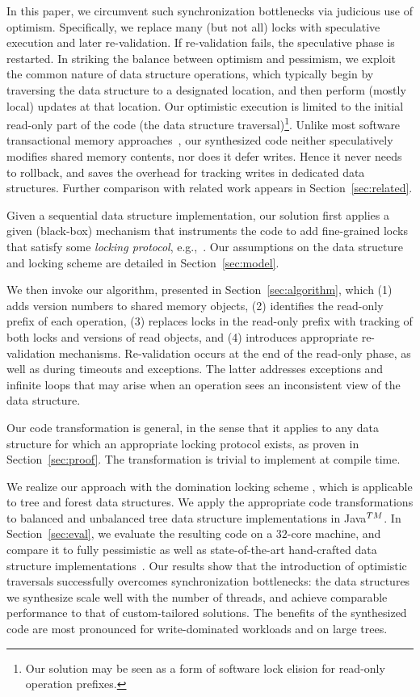 In this paper, we circumvent such synchronization bottlenecks via judicious use of optimism.
Specifically, we replace many (but not all) locks with speculative execution and later re-validation.
If re-validation fails, the speculative phase is restarted.
In striking the balance between optimism and pessimism, we exploit the common nature of data structure operations,
which typically begin by traversing the data structure to a designated location, and then perform (mostly local) updates at that location.
Our optimistic execution is limited to the initial read-only part of the code (the data structure traversal)\footnote{Our solution may be seen as a form of software lock elision for read-only operation prefixes.}.
Unlike most software transactional memory approaches~\cite{HLR:SLCA2010},
our synthesized code neither speculatively modifies shared memory contents, nor does it defer writes.
Hence it never needs to rollback, and saves the overhead for tracking writes in dedicated data structures.
Further comparison with related work appears in Section~\ref{sec:related}.

Given a sequential data structure implementation,
our solution first applies a given (black-box) mechanism that instruments the code to add
fine-grained locks that satisfy some \emph{locking protocol}, e.g.,~\cite{Gueta2011,MZGB:POPL06}.
Our assumptions on the data structure and locking scheme are detailed in Section~\ref{sec:model}.

We then invoke our algorithm, presented in Section~\ref{sec:algorithm}, which
(1) adds version numbers to shared memory objects,
(2) identifies the read-only prefix of each operation,
(3) replaces locks in the read-only prefix with tracking of both locks and versions of read objects, and
(4) introduces appropriate re-validation mechanisms.
Re-validation occurs at the end of the read-only phase, as well as during timeouts and exceptions.
The latter addresses exceptions and infinite loops that may arise when an operation sees an inconsistent view of the data structure.

Our code transformation is general, in the sense that it applies to any data structure for which an appropriate locking protocol exists,
as proven in Section~\ref{sec:proof}. The transformation is trivial to implement at compile time.

We realize our approach with the domination locking scheme \cite{Gueta2011},
which is applicable to tree and forest data structures.
We apply the appropriate code transformations to balanced and unbalanced tree data structure implementations in Java$^{\sc TM}$.
In Section~\ref{sec:eval}, we evaluate the resulting code on a $32$-core machine,
and compare it to fully pessimistic as well as state-of-the-art hand-crafted
data structure implementations~\cite{DrachslerVY2014,BronsonCCO2010}.
Our results show that the introduction of optimistic traversals successfully overcomes synchronization bottlenecks:
the data structures we synthesize scale well with the number of threads,
and achieve comparable performance to that of custom-tailored solutions.
The benefits of the synthesized code are most pronounced for write-dominated workloads and on large trees.

